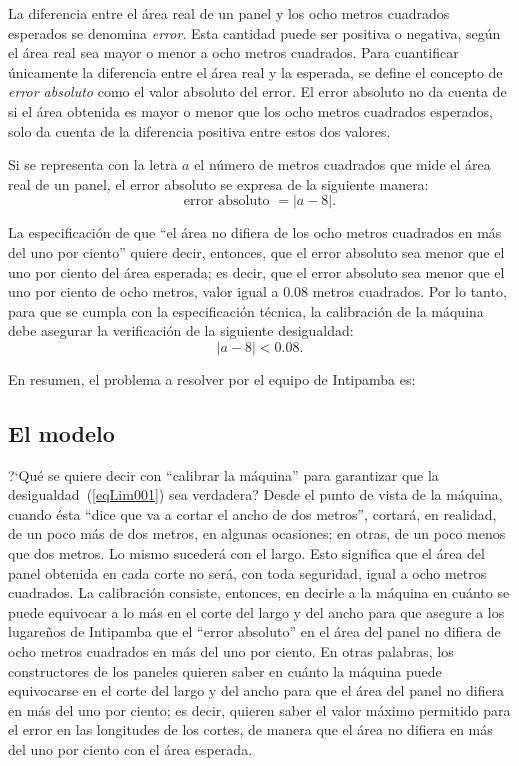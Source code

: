 La diferencia entre el área real de un panel y los ocho metros cuadrados esperados se denomina
\emph{error}. Esta cantidad puede ser positiva o negativa, según el área real sea mayor o menor a
ocho metros cuadrados. Para cuantificar únicamente la diferencia entre el área real y la esperada,
se define el concepto de \emph{error absoluto} como el valor absoluto del error. El error absoluto
no da cuenta de si el área obtenida es mayor o menor que los ocho metros cuadrados esperados, solo
da cuenta de la diferencia positiva entre estos dos valores.

Si se representa con la letra $a$ el número de metros cuadrados que mide el área real de un panel,
el error absoluto se expresa de la siguiente manera:
\[
\text{error absoluto } = |a - 8|.
\]

La especificación de que ``el área no difiera de los ocho metros cuadrados en más del uno por
ciento'' quiere decir, entonces, que el error absoluto sea menor que el uno por ciento del área
esperada; es decir, que el error absoluto sea menor que el uno por ciento de ocho metros, valor
igual a 0.08 metros cuadrados. Por lo tanto, para que se cumpla con la especificación técnica, la
calibración de la máquina debe asegurar la verificación de la siguiente desigualdad:
\[
|a - 8| < 0.08.
\]

En resumen, el problema a resolver por el equipo de Intipamba es:%

\subsection{El modelo}

?`Qué se quiere decir con ``calibrar la máquina'' para garantizar que la
desigualdad~(\ref{eqLim001}) sea verdadera? Desde el punto de vista de la máquina, cuando ésta
``dice que va a cortar el ancho de dos metros'', cortará, en realidad, de un poco más de dos
metros, en algunas ocasiones; en otras, de un poco menos que dos metros. Lo mismo sucederá con el
largo. Esto significa que el área del panel obtenida en cada corte no será, con toda seguridad,
igual a ocho metros cuadrados. La calibración consiste, entonces, en decirle a la máquina en cuánto
se puede equivocar a lo más en el corte del largo y del ancho para que asegure a los lugareños de
Intipamba que el ``error absoluto'' en el área del panel no difiera de ocho metros cuadrados en más
del uno por ciento. En otras palabras, los constructores de los paneles quieren saber en cuánto la
máquina puede equivocarse en el corte del largo y del ancho para que el área del panel no difiera
en más del uno por ciento; es decir, quieren saber el valor máximo permitido para el error en las
longitudes de los cortes, de manera que el área no difiera en más del uno por ciento con el área
esperada.

